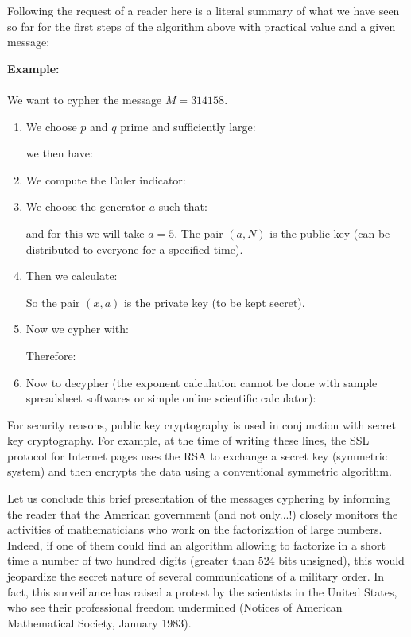 	Following the request of a reader here is a literal summary of what we have seen so far for the first steps of the algorithm above with practical value and a given message:
	\begin{tcolorbox}[colframe=black,colback=white,sharp corners]
	\textbf{{\Large {}}Example:}\\\\
	We want to cypher the message $M=314158$.

	\begin{enumerate} 
		\item We choose $p$ and $q$ prime and sufficiently large:
		
		we then have:
		
	
		\item We compute the Euler indicator:
		
	
		\item We choose the generator $a$ such that:
		
		and for this we will take $a=5$. The pair $(a,N)$ is the public key (can be distributed to everyone for a specified time).
	
		\item Then we calculate:
		
		So the pair $(x, a)$ is the private key (to be kept secret).
		
		\item Now we cypher with:
		
		Therefore:
		
		
		\item Now to decypher (the exponent calculation cannot be done with sample spreadsheet softwares or simple online scientific calculator):
		
	\end{enumerate}
	\end{tcolorbox}
	For security reasons, public key cryptography is used in conjunction with secret key cryptography. For example, at the time of writing these lines, the SSL protocol for Internet pages uses the RSA to exchange a secret key (symmetric system) and then encrypts the data using a conventional symmetric algorithm.

	Let us conclude this brief presentation of the messages cyphering by informing the reader that the American government (and not only...!) closely monitors the activities of mathematicians who work on the factorization of large numbers. Indeed, if one of them could find an algorithm allowing to factorize in a short time a number of two hundred digits (greater than $524$ bits unsigned), this would jeopardize the secret nature of several communications of a military order. In fact, this surveillance has raised a protest by the scientists in the United States, who see their professional freedom undermined (Notices of American Mathematical Society, January 1983).

